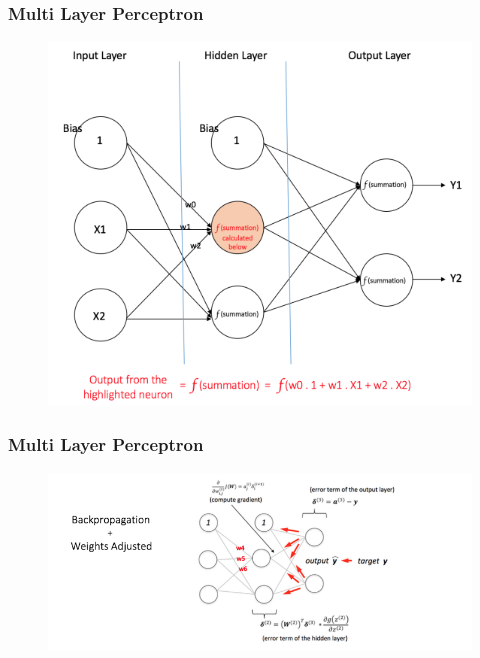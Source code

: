\documentclass{beamer} %
\begin{document}
\begin{frame}
\frametitle{Multi Layer Perceptron}
\begin{center}
	\begin{figure}
		\includegraphics[scale=0.75]{./image/forward}
		\label{fig:forwardprop}
	\end{figure}
\end{center}
\end{frame}

\begin{frame}
\frametitle{Multi Layer Perceptron}
\begin{center}
	\begin{figure}
		\includegraphics[scale=1]{./image/backward}
		\label{fig:backwardprop}
	\end{figure}
\end{center}
\end{frame}
\end{document}

